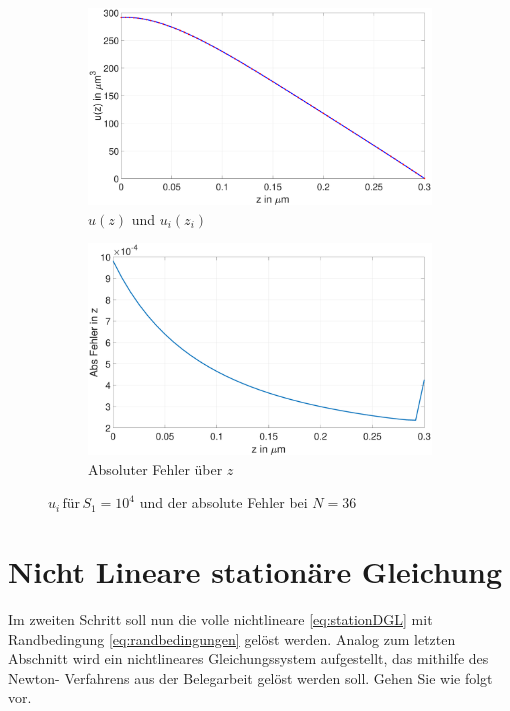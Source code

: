 \begin{figure}[h]
	\begin{subfigure}[b]{0.5\textwidth}
		\includegraphics[width=\textwidth]{figures/station_gl_2_1/S3}
		\caption{$u(z)$ und $u_{i}(z_i)$}
	\end{subfigure}
	\hfill
	\begin{subfigure}[b]{0.5\textwidth}
		\includegraphics[width=1\linewidth]{figures/station_gl_2_1/S3_fehler}
		\caption{Absoluter Fehler über $z$}
	\end{subfigure}
	\caption{$u_i \,\text{für} \, S_1=10^4$ und der absolute Fehler bei $N=36$ }
\end{figure}




\section{Nicht Lineare stationäre Gleichung}
\begin{mybox}
	Im zweiten Schritt soll nun die volle nichtlineare \cref{eq:stationDGL}
	mit Randbedingung \cref{eq:randbedingungen} gelöst werden. Analog
	zum letzten Abschnitt wird ein nichtlineares Gleichungssystem
	aufgestellt, das mithilfe des Newton-
	Verfahrens aus der Belegarbeit gelöst werden soll. Gehen Sie wie folgt
	vor.\cite{Prof.Dr.AndreasZeiser.April2021}
\end{mybox}

